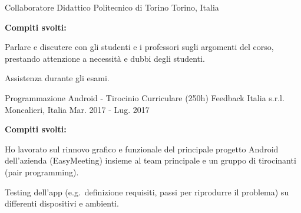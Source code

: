 {\begin{cventries}
  \cventry
    {Collaboratore Didattico} %
    {Politecnico di Torino} %
    {Torino, Italia} %
    {} %
    {
      \begin{cvsubentries}
      \end{cvsubentries}
      \begin{cvparagraph}
        \vspace{-3mm}
        {\textbf{Compiti svolti:}}
      \end{cvparagraph}
      \begin{cvitems} %
        \item {Parlare e discutere con gli studenti e i professori sugli argomenti del corso, prestando attenzione a necessità e dubbi degli studenti.}
        \item {Assistenza durante gli esami.}
      \end{cvitems}
    }{}

  \cventry
    {Programmazione Android - Tirocinio Curriculare (250h)} %
    {Feedback Italia s.r.l.} %
    {Moncalieri, Italia} %
    {Mar. 2017 - Lug. 2017} %
    {
      \begin{cvparagraph}
        {\textbf{Compiti svolti:}}
      \end{cvparagraph}
      \begin{cvitems} %
        \item {Ho lavorato sul rinnovo grafico e funzionale del principale progetto Android dell'azienda (EasyMeeting) insieme al team principale e un gruppo di tirocinanti (pair programming).}
        \item {Testing dell'app (e.g.\ definizione requisiti, passi per riprodurre il problema) su differenti dispositivi e ambienti.}
      \end{cvitems}
    }{}


\end{cventries}}
